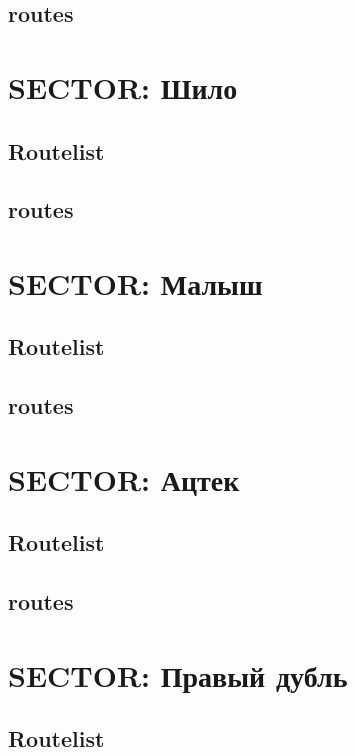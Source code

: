 \documentclass[8pt, a4paper,notitlepage,openany]{report}
\begin{document}
\section*{routes}



\chapter{SECTOR: Шило}
\section*{Routelist}

\newpage
\section*{routes}





\chapter{SECTOR: Малыш}
\section*{Routelist}

\newpage
\section*{routes}


\chapter{SECTOR: Ацтек}
\section*{Routelist}

\newpage
\section*{routes}





\chapter{SECTOR: Правый дубль}
\section*{Routelist}

\newpage
\end{document}
